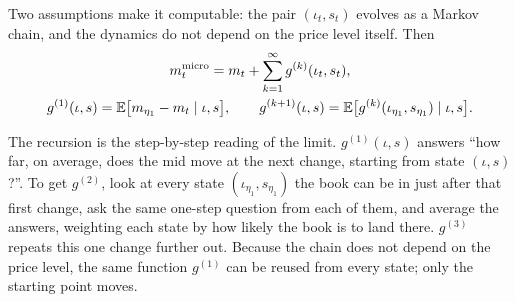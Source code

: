 Two assumptions make it computable: the pair $(\iota_t, s_t)$ evolves as a Markov chain, and the
dynamics do not depend on the price level itself. Then
\begin{equation}
  \begin{gathered}
  m^{\text{micro}}_t = m_t + \sum_{k=1}^{\infty} g^{(k)}(\iota_t, s_t), \\
  g^{(1)}(\iota, s) = \mathbb{E}\big[m_{\eta_1} - m_t \mid \iota, s\big], \qquad
  g^{(k+1)}(\iota, s) = \mathbb{E}\big[g^{(k)}(\iota_{\eta_1}, s_{\eta_1}) \mid \iota, s\big].
  \end{gathered}
\end{equation}

\noindent The recursion is the step-by-step reading of the limit. $g^{(1)}(\iota, s)$ answers ``how
far, on average, does the mid move at the next change, starting from state $(\iota, s)$?''. To get
$g^{(2)}$, look at every state $(\iota_{\eta_1}, s_{\eta_1})$ the book can be in just after that first
change, ask the same one-step question from each of them, and average the answers, weighting each
state by how likely the book is to land there. $g^{(3)}$ repeats this one change further out. Because
the chain does not depend on the price level, the same function $g^{(1)}$ can be reused from every
state; only the starting point moves.

